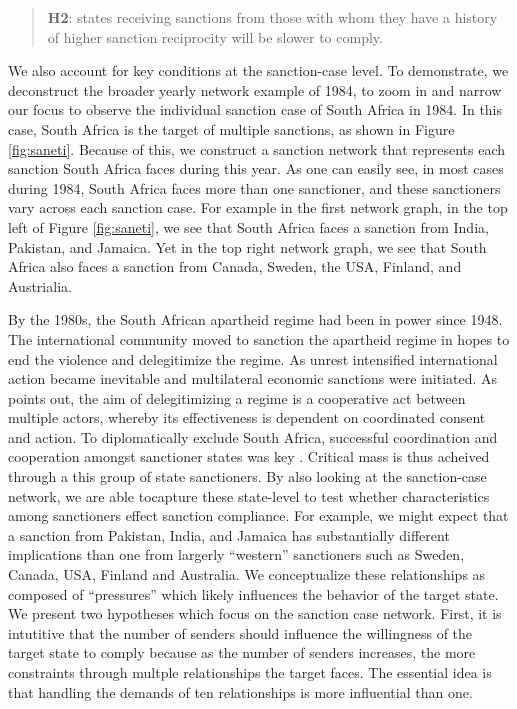 \begin{quote}
	\textbf{H2}: states receiving sanctions from those with whom they have a history of higher sanction reciprocity will be slower to comply.
\end{quote}

We also account for key conditions at the sanction-case level. To demonstrate, we deconstruct the broader yearly network example of 1984, to zoom in and narrow our focus to observe the individual sanction case of South Africa in 1984. In this case, South Africa is the target of multiple sanctions, as shown in Figure \ref{fig:saneti}. Because of this, we construct a sanction network that represents each sanction South Africa faces during this year. As one can easily see, in most cases during 1984, South Africa faces more than one sanctioner, and these sanctioners vary across each sanction case. For example in the first network graph, in the top left of Figure \ref{fig:saneti}, we see that South Africa faces a sanction from India, Pakistan, and Jamaica. Yet in the top right network graph, we see that South Africa also faces a sanction from Canada, Sweden, the USA, Finland, and Austrialia. 

By the 1980s, the South African apartheid regime had been in power since 1948. The international community moved to sanction the apartheid regime in hopes to end the violence and delegitimize the regime. As unrest intensified international action became inevitable and multilateral economic sanctions were initiated. As \citet{kinne2013dependent} points out, the aim of delegitimizing a regime is a cooperative act between multiple actors, whereby its effectiveness is dependent on coordinated consent and action. To diplomatically exclude South Africa, successful coordination and cooperation amongst sanctioner states was key \citep{kinne2013dependent,christopher1994pattern}. Critical mass is thus acheived through a this group of state sanctioners. By also looking at the sanction-case network, we are able tocapture these state-level to test whether characteristics among sanctioners effect sanction compliance. For example, we might expect that a sanction from Pakistan, India, and Jamaica has substantially different implications than one from largerly ``western'' sanctioners such as Sweden, Canada, USA, Finland and Australia. We conceptualize these relationships as composed of ``pressures'' which likely influences the behavior of the target state. We present two hypotheses which focus on the sanction case network. First, it is intutitive that the number of senders should influence the willingness of the target state to comply because as the number of senders increases, the more constraints through multple relationships the target faces. The essential idea is that handling the demands of ten relationships is more influential than one. 

